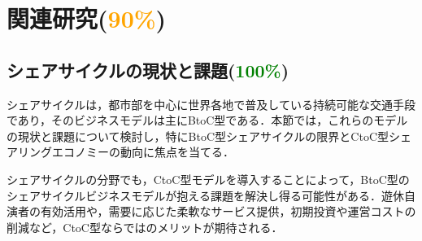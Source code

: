 \section{関連研究(\textcolor{orange}{90\%})}
  \label{sec:関連研究}
    \par
  
  \subsection{シェアサイクルの現状と課題(\textcolor{green}{100\%})}
    \label{sec:シェアサイクルの現状と課題}
      \par シェアサイクルは，都市部を中心に世界各地で普及している持続可能な交通手段であり，そのビジネスモデルは主にBtoC型である．本節では，これらのモデルの現状と課題について検討し，特にBtoC型シェアサイクルの限界とCtoC型シェアリングエコノミーの動向に焦点を当てる．
      \par シェアサイクルの分野でも，CtoC型モデルを導入することによって，BtoC型のシェアサイクルビジネスモデルが抱える課題を解決し得る可能性がある．遊休自演者の有効活用や，需要に応じた柔軟なサービス提供，初期投資や運営コストの削減など，CtoC型ならではのメリットが期待される．
      
